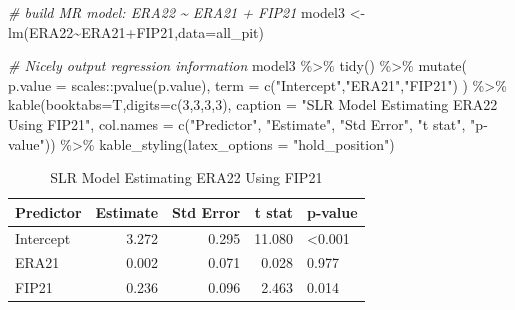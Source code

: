 \documentclass[
  11pt,
]{book}
\newenvironment{Shaded}{\begin{snugshade}}{\end{snugshade}}
\newcommand{\AttributeTok}[1]{\textcolor[rgb]{0.77,0.63,0.00}{#1}}
\newcommand{\CommentTok}[1]{\textcolor[rgb]{0.56,0.35,0.01}{\textit{#1}}}
\newcommand{\DecValTok}[1]{\textcolor[rgb]{0.00,0.00,0.81}{#1}}
\newcommand{\FunctionTok}[1]{\textcolor[rgb]{0.00,0.00,0.00}{#1}}
\newcommand{\NormalTok}[1]{#1}
\newcommand{\OtherTok}[1]{\textcolor[rgb]{0.56,0.35,0.01}{#1}}
\newcommand{\SpecialCharTok}[1]{\textcolor[rgb]{0.00,0.00,0.00}{#1}}
\newcommand{\StringTok}[1]{\textcolor[rgb]{0.31,0.60,0.02}{#1}}
\theoremstyle{definition}
\theoremstyle{definition}
\theoremstyle{definition}
\theoremstyle{definition}
\theoremstyle{remark}
\begin{document}
\begin{Shaded}
\begin{Highlighting}[]
\CommentTok{\# build MR model: ERA22 \textasciitilde{} ERA21 + FIP21}
\NormalTok{model3 }\OtherTok{\textless{}{-}} \FunctionTok{lm}\NormalTok{(ERA22}\SpecialCharTok{\textasciitilde{}}\NormalTok{ERA21}\SpecialCharTok{+}\NormalTok{FIP21,}\AttributeTok{data=}\NormalTok{all\_pit)}

\CommentTok{\# Nicely output regression information}
\NormalTok{model3 }\SpecialCharTok{\%\textgreater{}\%} \FunctionTok{tidy}\NormalTok{() }\SpecialCharTok{\%\textgreater{}\%}
  \FunctionTok{mutate}\NormalTok{(}
    \AttributeTok{p.value =}\NormalTok{ scales}\SpecialCharTok{::}\FunctionTok{pvalue}\NormalTok{(p.value),}
    \AttributeTok{term =} \FunctionTok{c}\NormalTok{(}\StringTok{"Intercept"}\NormalTok{,}\StringTok{"ERA21"}\NormalTok{,}\StringTok{"FIP21"}\NormalTok{)}
\NormalTok{  ) }\SpecialCharTok{\%\textgreater{}\%}
  \FunctionTok{kable}\NormalTok{(}\AttributeTok{booktabs=}\NormalTok{T,}\AttributeTok{digits=}\FunctionTok{c}\NormalTok{(}\DecValTok{3}\NormalTok{,}\DecValTok{3}\NormalTok{,}\DecValTok{3}\NormalTok{,}\DecValTok{3}\NormalTok{), }
        \AttributeTok{caption =} \StringTok{"SLR Model Estimating ERA22 Using FIP21"}\NormalTok{,}
        \AttributeTok{col.names =} \FunctionTok{c}\NormalTok{(}\StringTok{"Predictor"}\NormalTok{, }\StringTok{"Estimate"}\NormalTok{, }\StringTok{"Std Error"}\NormalTok{, }\StringTok{"t stat"}\NormalTok{, }\StringTok{"p{-}value"}\NormalTok{)) }\SpecialCharTok{\%\textgreater{}\%}
  \FunctionTok{kable\_styling}\NormalTok{(}\AttributeTok{latex\_options =} \StringTok{"hold\_position"}\NormalTok{)}
\end{Highlighting}
\end{Shaded}

\begin{table}[!h]

\caption{\label{tab:unnamed-chunk-190}SLR Model Estimating ERA22 Using FIP21}
\centering
\begin{tabular}[t]{lrrrl}
\toprule
Predictor & Estimate & Std Error & t stat & p-value\\
\midrule
Intercept & 3.272 & 0.295 & 11.080 & <0.001\\
ERA21 & 0.002 & 0.071 & 0.028 & 0.977\\
FIP21 & 0.236 & 0.096 & 2.463 & 0.014\\
\bottomrule
\end{tabular}
\end{table}
\end{document}
